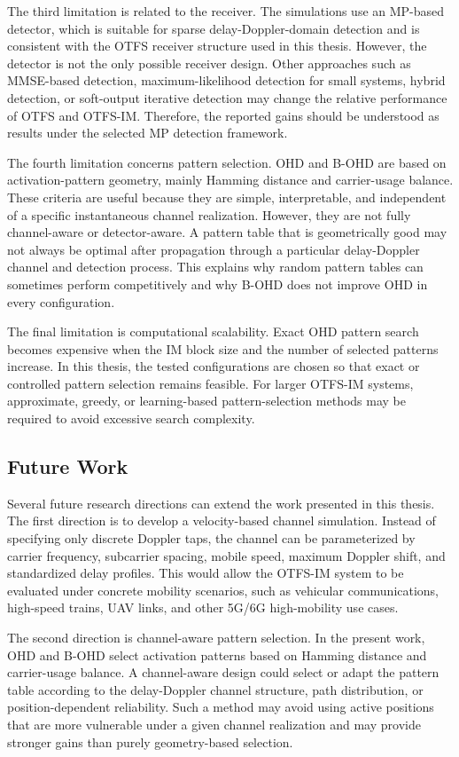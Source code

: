 The third limitation is related to the receiver. The simulations use an MP-based detector, which is suitable for sparse delay-Doppler-domain detection and is consistent with the OTFS receiver structure used in this thesis. However, the detector is not the only possible receiver design. Other approaches such as MMSE-based detection, maximum-likelihood detection for small systems, hybrid detection, or soft-output iterative detection may change the relative performance of OTFS and OTFS-IM. Therefore, the reported gains should be understood as results under the selected MP detection framework.

The fourth limitation concerns pattern selection. OHD and B-OHD are based on activation-pattern geometry, mainly Hamming distance and carrier-usage balance. These criteria are useful because they are simple, interpretable, and independent of a specific instantaneous channel realization. However, they are not fully channel-aware or detector-aware. A pattern table that is geometrically good may not always be optimal after propagation through a particular delay-Doppler channel and detection process. This explains why random pattern tables can sometimes perform competitively and why B-OHD does not improve OHD in every configuration.

The final limitation is computational scalability. Exact OHD pattern search becomes expensive when the IM block size and the number of selected patterns increase. In this thesis, the tested configurations are chosen so that exact or controlled pattern selection remains feasible. For larger OTFS-IM systems, approximate, greedy, or learning-based pattern-selection methods may be required to avoid excessive search complexity.

\subsection{Future Work}

Several future research directions can extend the work presented in this thesis. The first direction is to develop a velocity-based channel simulation. Instead of specifying only discrete Doppler taps, the channel can be parameterized by carrier frequency, subcarrier spacing, mobile speed, maximum Doppler shift, and standardized delay profiles. This would allow the OTFS-IM system to be evaluated under concrete mobility scenarios, such as vehicular communications, high-speed trains, UAV links, and other 5G/6G high-mobility use cases.

The second direction is channel-aware pattern selection. In the present work, OHD and B-OHD select activation patterns based on Hamming distance and carrier-usage balance. A channel-aware design could select or adapt the pattern table according to the delay-Doppler channel structure, path distribution, or position-dependent reliability. Such a method may avoid using active positions that are more vulnerable under a given channel realization and may provide stronger gains than purely geometry-based selection.

